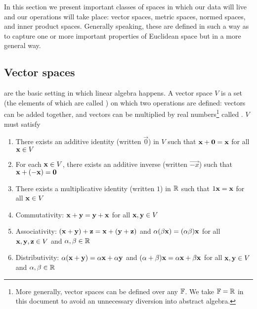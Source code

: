 In this section we present important classes of spaces in which our data will live and our operations will take place: vector spaces, metric spaces, normed spaces, and inner product spaces.
Generally speaking, these are defined in such a way as to capture one or more important properties of Euclidean space but in a more general way.

\subsection{Vector spaces}
 are the basic setting in which linear algebra happens.
A vector space $V$ is a set (the elements of which are called ) on which two operations are defined: vectors can be added together, and vectors can be multiplied by real numbers\footnote{
    More generally, vector spaces can be defined over any  $\mathbb{F}$.
    We take $\mathbb{F} = \mathbb{R}$ in this document to avoid an unnecessary diversion into abstract algebra.
} called .
$V$ must satisfy
\begin{enumerate}
\item There exists an additive identity (written $\vec{0}$) in $V$ such that $\mathbf{x}+\mathbf{0} = \mathbf{x}$ for all $\mathbf{x} \in V$
\item For each $\mathbf{x} \in V$, there exists an additive inverse (written $\vec{-x}$) such that $\mathbf{x}+(\mathbf{-x}) = \mathbf{0}$
\item There exists a multiplicative identity (written $1$) in $\mathbb{R}$ such that $1\mathbf{x} = \mathbf{x}$ for all $\mathbf{x} \in V$
\item Commutativity: $\mathbf{x}+\mathbf{y} = \mathbf{y}+\mathbf{x}$ for all $\mathbf{x}, \mathbf{y} \in V$
\item Associativity: $(\mathbf{x}+\mathbf{y})+\mathbf{z} = \mathbf{x}+(\mathbf{y}+\mathbf{z})$ and $\alpha(\beta\mathbf{x}) = (\alpha\beta)\mathbf{x}$ for all $\mathbf{x}, \mathbf{y}, \mathbf{z} \in V$ and $\alpha, \beta \in \mathbb{R}$
\item Distributivity: $\alpha(\mathbf{x}+\mathbf{y}) = \alpha\mathbf{x} + \alpha\mathbf{y}$ and $(\alpha+\beta)\mathbf{x} = \alpha\mathbf{x} + \beta\mathbf{x}$ for all $\mathbf{x}, \mathbf{y} \in V$ and $\alpha, \beta \in \mathbb{R}$
\end{enumerate}

